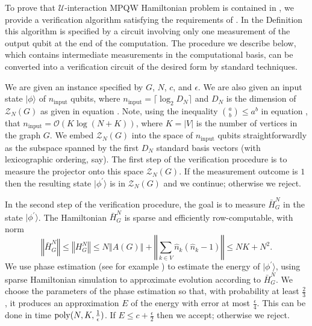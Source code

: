 \documentclass[../thesis-main/thesis-main]{subfiles}
\begin{document}
To prove that $\mathcal{U}$-interaction MPQW Hamiltonian problem is contained in \QMA, we provide a verification algorithm satisfying the requirements of . In the Definition this algorithm is specified by a circuit involving only one measurement of the output qubit at the end of the computation. The procedure we describe below, which contains intermediate measurements in the computational basis, can be converted into a verification circuit of the desired form by standard techniques.

We are given an instance specified by $G$, $N$, $c$, and $\epsilon$. We are also given an input state $|\phi\rangle$ of $n_{\text{input}}$ qubits, where $n_{\text{input}}=\lceil \log_{2}D_{N}\rceil $ and $D_{N}$ is the dimension of $\mathcal{Z}_{N}(G)$ as given in equation . Note, using the inequality $\binom{a}{b} \leq a^{b}$ in equation , that $n_{\text{input}}=\mathcal{O}(K\log\left(N+K\right))$, where $K=|V|$ is the number of vertices in the graph $G$. We embed $\mathcal{Z}_{N}(G)$ into the space of $n_{\text{input}}$ qubits straightforwardly as the subspace spanned by the first $D_{N}$ standard basis vectors (with lexicographic ordering, say). The first step of the verification procedure is to measure the projector onto this space $\mathcal{Z}_{N}(G)$. If the measurement outcome is $1$ then the resulting state $|\phi^{\prime}\rangle$ is in $\mathcal{Z}_{N}(G)$ and we continue; otherwise we reject.

In the second step of the verification procedure, the goal is to measure $\bar{H}_{G}^{N}$ in the state $|\phi^{\prime}\rangle$. The Hamiltonian $\bar{H}_{G}^{N}$ is sparse and efficiently row-computable, with norm
\[
\left\Vert \bar{H}_{G}^{N}\right\Vert \leq\left\Vert H_{G}^{N}\right\Vert \leq N\left\Vert A(G)\right\Vert +\left\Vert \sum_{k\in V}\hat{n}_{k}\left(\hat{n}_{k}-1\right)\right\Vert \leq NK+N^{2}.
\]
We use phase estimation (see for example \cite{CEMM98}) to estimate the energy of $|\phi^{\prime}\rangle$, using sparse Hamiltonian simulation \cite{AT03} to approximate evolution according to $\bar{H}_{G}^{N}$. We choose the parameters of the phase estimation so that, with probability at least $\frac{2}{3}$, it produces an approximation $E$ of the energy with error at most $\frac{\epsilon}{4}$. This can be done in time $\operatorname{poly}(N,K,\frac{1}{\epsilon})$. If $E\leq c+\frac{\epsilon}{2}$ then we accept; otherwise we reject.
\end{document}
